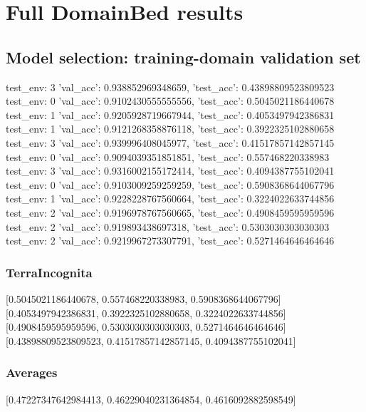 \documentclass{article}
\begin{document}
\section{Full DomainBed results}

\subsection{Model selection: training-domain validation set}
test_env: 3
{'val_acc': 0.938852969348659, 'test_acc': 0.43898809523809523}
test_env: 0
{'val_acc': 0.9102430555555556, 'test_acc': 0.5045021186440678}
test_env: 1
{'val_acc': 0.9205928719667944, 'test_acc': 0.4053497942386831}
test_env: 1
{'val_acc': 0.9121268358876118, 'test_acc': 0.3922325102880658}
test_env: 3
{'val_acc': 0.939996408045977, 'test_acc': 0.41517857142857145}
test_env: 0
{'val_acc': 0.9094039351851851, 'test_acc': 0.557468220338983}
test_env: 3
{'val_acc': 0.9316002155172414, 'test_acc': 0.4094387755102041}
test_env: 0
{'val_acc': 0.9103009259259259, 'test_acc': 0.5908368644067796}
test_env: 1
{'val_acc': 0.9228228767560664, 'test_acc': 0.3224022633744856}
test_env: 2
{'val_acc': 0.9196978767560665, 'test_acc': 0.4908459595959596}
test_env: 2
{'val_acc': 0.919893438697318, 'test_acc': 0.5303030303030303}
test_env: 2
{'val_acc': 0.9219967273307791, 'test_acc': 0.5271464646464646}

\subsubsection{TerraIncognita}
[0.5045021186440678, 0.557468220338983, 0.5908368644067796]
[0.4053497942386831, 0.3922325102880658, 0.3224022633744856]
[0.4908459595959596, 0.5303030303030303, 0.5271464646464646]
[0.43898809523809523, 0.41517857142857145, 0.4094387755102041]

\begin{center}
\end{center}

\subsubsection{Averages}
[0.47227347642984413, 0.46229040231364854, 0.4616092882598549]

\begin{center}
\end{center}
\end{document}
